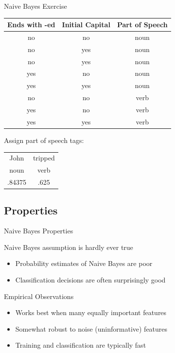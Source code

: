 \documentclass[12pt]{beamer}
\newcommand{\tab}{\hspace{1em}}
\begin{document}
\begin{frame}{Naive Bayes Exercise}
	\begin{center}
		\begin{tabular}[t]{cc|c}
			Ends with -ed  & Initial Capital  & Part of Speech \\
			\hline
			no             & no               & noun \\
			no             & yes              & noun \\
			no             & yes              & noun \\
			yes            & no               & noun \\
			yes            & yes              & noun \\
			no             & no               & verb \\
			yes            & no               & verb \\
			yes            & yes              & verb \\
		\end{tabular}
		
		\bigskip
		Assign part of speech tags:
		\tab\tab
		\begin{tabular}[t]{cc}
			John            & tripped \\
			\pause
			noun            & verb    \\
			\pause
			.84375          & .625 \\
		\end{tabular}
	\end{center}
\end{frame}

\subsection{Properties}
\begin{frame}[<+->]{Naive Bayes Properties}
	\begin{block}{Naive Bayes assumption is hardly ever true}
		\begin{itemize}
			\item Probability estimates of Naive Bayes are poor
			\item Classification decisions are often surprisingly good
		\end{itemize}
	\end{block}
	\begin{block}{Empirical Observations}
		\begin{itemize}
			\item Works best when many equally important features
			\item Somewhat robust to noise (uninformative) features
			\item Training and classification are typically fast
		\end{itemize}
	\end{block}
\end{frame}
\end{document}
